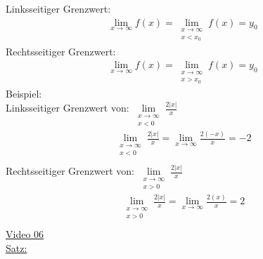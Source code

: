 Linksseitiger Grenzwert:\\
\begin{align*}
\lim\limits_ {x\to\infty} f(x)=\lim\limits_ {\substack{x\to\infty\\x<x_0}}f(x)=y_0
\end{align*}
Rechtsseitiger Grenzwert:\\
\begin{align*}
\lim\limits_ {x\to\infty} f(x)=\lim\limits_ {\substack{x\to\infty\\x>x_0}}f(x)=y_0
\end{align*}
Beispiel:\\
\textbullet \;\; Linksseitiger Grenzwert von: $ \lim\limits_ {\substack{x\to\infty\\x<0}}\frac{2|x|}{x} $\\
\begin{align*}
\lim\limits_ {\substack{x\to\infty\\x<0}}\frac{2|x|}{x}=\lim\limits_ {x\to\infty}\frac{2(-x)}{x}=-2\\
\end{align*}
\textbullet \;\; Rechtsseitiger Grenzwert von: $ \lim\limits_ {\substack{x\to\infty\\x>0}}\frac{2|x|}{x} $\\
\begin{align*}
\lim\limits_ {\substack{x\to\infty\\x>0}}\frac{2|x|}{x}=\lim\limits_ {x\to\infty}\frac{2(x)}{x}=2\\
\end{align*}
\href{https://youtu.be/KLn2p_dOASs}{Video 06}\\
\underline{Satz:}\\
\begin{center}

\end{center}
\vspace*{4mm}
